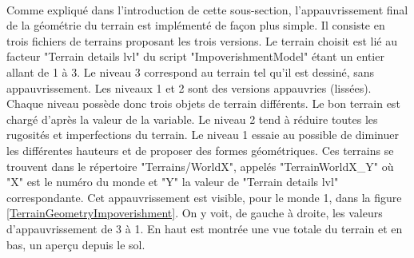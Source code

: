 		\begin{minipage}{\linewidth}
			\label{TerrainGeneration}
		\end{minipage}\medskip	
		\\
	
		Comme expliqué dans l'introduction de cette sous-section, l'appauvrissement final de la géométrie du terrain est implémenté de façon plus simple. Il consiste en trois fichiers de terrains proposant les trois versions. Le terrain choisit est lié au facteur "Terrain details lvl" du script "ImpoverishmentModel" étant un entier allant de 1 à 3. Le niveau 3 correspond au terrain tel qu'il est dessiné, sans appauvrissement. Les niveaux 1 et 2 sont des versions appauvries (lissées). Chaque niveau possède donc trois objets de terrain différents. Le bon terrain est chargé d'après la valeur de la variable. Le niveau 2 tend à réduire toutes les rugosités et imperfections du terrain. Le niveau 1 essaie au possible de diminuer les différentes hauteurs et de proposer des formes géométriques. Ces terrains se trouvent dans le répertoire "Terrains/WorldX", appelés "TerrainWorldX\_Y" où "X" est le numéro du monde et "Y" la valeur de "Terrain details lvl" correspondante. Cet appauvrissement est visible, pour le monde 1, dans la figure \ref{TerrainGeometryImpoverishment}. On y voit, de gauche à droite, les valeurs d'appauvrissement de 3 à 1. En haut est montrée une vue totale du terrain et en bas, un aperçu depuis le sol.\medskip
		
